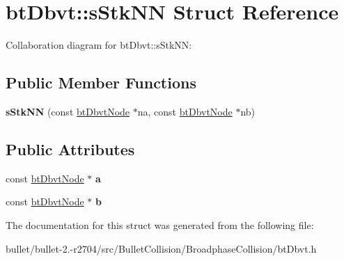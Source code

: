 \hypertarget{structbt_dbvt_1_1s_stk_n_n}{\section{bt\+Dbvt\+:\+:s\+Stk\+N\+N Struct Reference}
\label{structbt_dbvt_1_1s_stk_n_n}
}


Collaboration diagram for bt\+Dbvt\+:\+:s\+Stk\+N\+N\+:
\subsection*{Public Member Functions}
\begin{DoxyCompactItemize}
\item 
\hypertarget{structbt_dbvt_1_1s_stk_n_n_acd85b4e34cf3b692cf8e9df562a18373}{{\bfseries s\+Stk\+N\+N} (const \hyperlink{structbt_dbvt_node}{bt\+Dbvt\+Node} $\ast$na, const \hyperlink{structbt_dbvt_node}{bt\+Dbvt\+Node} $\ast$nb)}\label{structbt_dbvt_1_1s_stk_n_n_acd85b4e34cf3b692cf8e9df562a18373}

\end{DoxyCompactItemize}
\subsection*{Public Attributes}
\begin{DoxyCompactItemize}
\item 
\hypertarget{structbt_dbvt_1_1s_stk_n_n_af5cb38a8e29d2ac8588e5adeabb65cbd}{const \hyperlink{structbt_dbvt_node}{bt\+Dbvt\+Node} $\ast$ {\bfseries a}}\label{structbt_dbvt_1_1s_stk_n_n_af5cb38a8e29d2ac8588e5adeabb65cbd}

\item 
\hypertarget{structbt_dbvt_1_1s_stk_n_n_a3d2da8c5f190c610ef8e05de33c31b1b}{const \hyperlink{structbt_dbvt_node}{bt\+Dbvt\+Node} $\ast$ {\bfseries b}}\label{structbt_dbvt_1_1s_stk_n_n_a3d2da8c5f190c610ef8e05de33c31b1b}

\end{DoxyCompactItemize}


The documentation for this struct was generated from the following file\+:\begin{DoxyCompactItemize}
\item 
bullet/bullet-\/2.-\/r2704/src/\+Bullet\+Collision/\+Broadphase\+Collision/bt\+Dbvt.\+h\end{DoxyCompactItemize}
